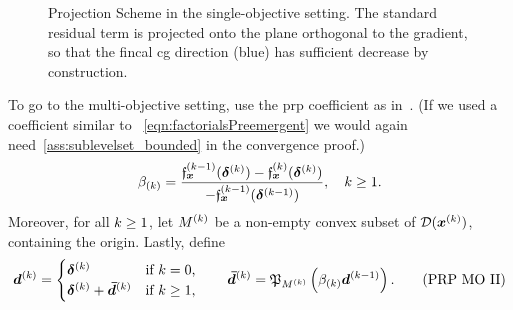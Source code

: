 \documentclass{article}
\theoremstyle{plain}
\theoremstyle{definition}
\begin{document}
\begin{figure}[h!]
    \centering
	\caption{
		Projection Scheme in the single-objective setting. The standard residual term is 
		projected onto the plane orthogonal to the gradient, so that the fincal \ac{cg}
		direction (blue) has sufficient decrease by construction.%
	}
\end{figure}

To go to the multi-objective setting, use the \ac{prp} coefficient
as in~\cite{lucambioperezNonlinearConjugateGradient2018}.
(If we used a coefficient similar to ~\eqref{eqn:factorialsPreemergent}
we would again need~\cref{ass:sublevelset_bounded} in the convergence proof.)
\begin{equation}
	\beta_{(k)} = 
\frac{\mathfrak{f}_{\bm{x}}^{(k-1)}(\bm{\delta}^{(k)}) - \mathfrak{f}_{\bm{x}}^{(k)}(\bm{\delta}^{(k)})}{-\mathfrak{f}_{\bm{x}}^{(k-1)}(\bm{\delta}^{(k-1)})},
\quad
k\geq 1.
\label{eqn:tarnishesBandeaux}
\end{equation}
Moreover, for all $k \geq 1$, let $M^{(k)}$ be a non-empty convex
subset of $\mathcal D(\bm{x}^{(k)})$, containing the origin.
Lastly, define
\begin{equation}
	\bm{d}^{(k)} = 
	\begin{cases}
		\bm{\delta}^{(k)}
		&\text{if $k = 0$,}
		\\
		\bm{\delta}^{(k)} + \bm{\bar{d}}^{(k)}
		&\text{if $k \geq 1$},
	\end{cases}
	\qquad
	\bm{\bar{d}}^{(k)} 
	= 
	\mathfrak P_{M^{(k)}}\left(\beta_{(k)} \bm{d}^{(k-1)}\right)
	.
	\tag{PRP~MO~II}
	\label{eqn:prpMOProj}
\end{equation}
\end{document}

